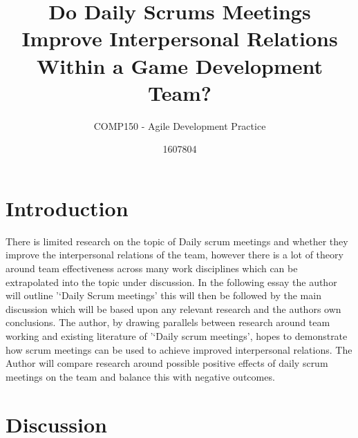 \documentclass{scrartcl}
\title{Do Daily Scrums Meetings Improve Interpersonal Relations Within a Game Development Team?}
\subtitle{COMP150 - Agile Development Practice}
\author{1607804}
\begin{document}
\maketitle


\section{Introduction}
There is limited research on the topic of Daily scrum meetings and whether they improve the interpersonal relations of the team, however there is a lot of theory around team effectiveness across many work disciplines which can be extrapolated into the topic under discussion. 
In the following essay the author will outline '‘Daily Scrum meetings' this will then be followed by the main discussion which will be based upon any relevant research and the authors own conclusions. 
 The author, by drawing parallels between research around team working and existing literature of '‘Daily scrum meetings', hopes to demonstrate how scrum meetings can be used to achieve improved interpersonal relations. 
The Author will compare research around possible positive effects of daily scrum meetings on the team and balance this with negative outcomes. 


\section{Discussion}
\end{document}
